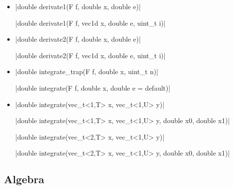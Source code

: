 \documentclass[12pt]{report}
\begin{document}
\begin{itemize}
\item \cppinline|double derivate1(F f, double x, double e)| 

\cppinline|double derivate1(F f, vec1d x, double e, uint_t i)| 

\item \cppinline|double derivate2(F f, double x, double e)| 

\cppinline|double derivate2(F f, vec1d x, double e, uint_t i)| 

\item \cppinline|double integrate_trap(F f, double x, uint_t n)| 

\cppinline|double integrate(F f, double x, double e = default)| 

\item \cppinline|double integrate(vec_t<1,T> x, vec_t<1,U> y)| 

\cppinline|double integrate(vec_t<1,T> x, vec_t<1,U> y, double x0, double x1)|

\cppinline|double integrate(vec_t<2,T> x, vec_t<1,U> y)|

\cppinline|double integrate(vec_t<2,T> x, vec_t<1,U> y, double x0, double x1)|

\end{itemize}

\subsection{Algebra}
\end{document}
